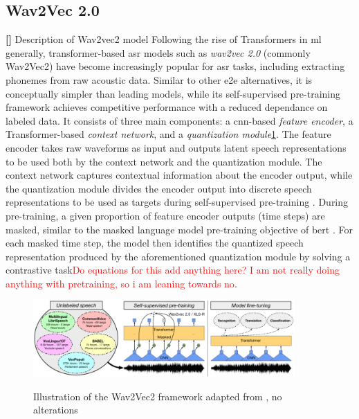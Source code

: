 \documentclass[thesis]{cluu}
\newcounter{paranum}
\newcommand{\numberedparagraph}{\par\refstepcounter{paranum}\textbf{[\theparanum] }}
\newcommand{\todo}[1]{\textcolor{red}{#1}}
\begin{document}
\subsection{Wav2Vec 2.0}
\numberedparagraph{Description of Wav2vec2 model}
Following the rise of Transformers in \gls{ml} generally, transformer-based \gls{asr} models such as \textit{wav2vec 2.0} (commonly Wav2Vec2) have become increasingly popular for \gls{asr} tasks, including extracting phonemes from raw acoustic data. Similar to other \gls{e2e} alternatives, it is conceptually simpler than leading models, while its self-supervised pre-training framework achieves competitive performance with a reduced dependance on labeled data. It consists of three main components: a \gls{cnn}-based \textit{feature encoder}, a Transformer-based \textit{context network}, and a \textit{quantization module}\ref{fig:wav2vec2architecture}. The feature encoder takes raw waveforms as input and outputs latent speech representations to be used both by the context network and the quantization module. The context network captures contextual information about the encoder output, while the quantization module divides the encoder output into discrete speech representations to be used as targets during self-supervised pre-training \parencite{baevskiEffectivenessSelfsupervisedPretraining2020}. During pre-training, a given proportion of feature encoder outputs (time steps) are masked, similar to the masked language model pre-training objective of \gls{bert} \parencite{devlinBERTPretrainingDeep2019}. For each masked time step, the model then identifies the quantized speech representation produced by the aforementioned quantization module by solving a contrastive task\todo{Do equations for this add anything here? I am not really doing anything with pretraining, so i am leaning towards no}.

\begin{figure}[h]
    \includegraphics[width=10cm]{wav2vec2.png}
    \centering
    \label{fig:wav2vec2architecture}
    \caption{Illustration of the Wav2Vec2 framework adapted from \textcite{babuXLSRSelfsupervisedCrosslingual2021}, no alterations}
\end{figure} 
\end{document}
